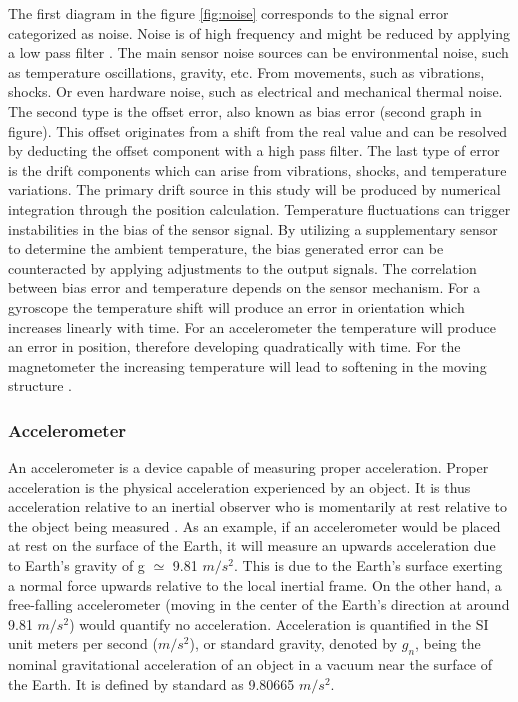 The first diagram in the figure \ref{fig:noise} corresponds to the signal error categorized as noise. Noise is of high frequency and might be reduced by applying a low pass filter \cite{kaiser1977data}. The main sensor noise sources can be environmental noise, such as temperature oscillations, gravity, etc. From movements, such as vibrations, shocks. Or even hardware noise, such as electrical and mechanical thermal noise. The second type is the offset error, also known as bias error (second graph in figure). This offset originates from a shift from the real value and can be resolved by deducting the offset component with a high pass filter. The last type of error is the drift components which can arise from vibrations, shocks, and temperature variations. The primary drift source in this study will be produced by numerical integration through the position calculation. Temperature fluctuations can trigger instabilities in the bias of the sensor signal. By utilizing a supplementary sensor to determine the ambient temperature, the bias generated error can be counteracted by applying adjustments to the output signals. The correlation between bias error and temperature depends on the sensor mechanism. For a gyroscope the temperature shift will produce an error in orientation which increases linearly with time. For an accelerometer the temperature will produce an error in position, therefore developing quadratically with time. For the magnetometer the increasing temperature will lead to softening in the moving structure \cite{el2007temperature}.

\subsubsection{Accelerometer}

An accelerometer is a device capable of measuring proper acceleration. Proper acceleration is the physical acceleration experienced by an object. It is thus acceleration relative to an inertial observer who is momentarily at rest relative to the object being measured \cite{pons2019observers}. As an example, if an accelerometer would be placed at rest on the surface of the Earth, it will measure an upwards acceleration due to Earth's gravity of g $\simeq$ 9.81 $m/s^2$. This is due to the Earth's surface exerting a normal force upwards relative to the local inertial frame. On the other hand, a free-falling accelerometer (moving in the center of the Earth's direction at around 9.81 $m/s^2$) would quantify no acceleration. Acceleration is quantified in the SI unit meters per second ($m/s^2$), or standard gravity, denoted by $g_n$, being the nominal gravitational acceleration of an object in a vacuum near the surface of the Earth. It is defined by standard as 9.80665 $m/s^2$.


